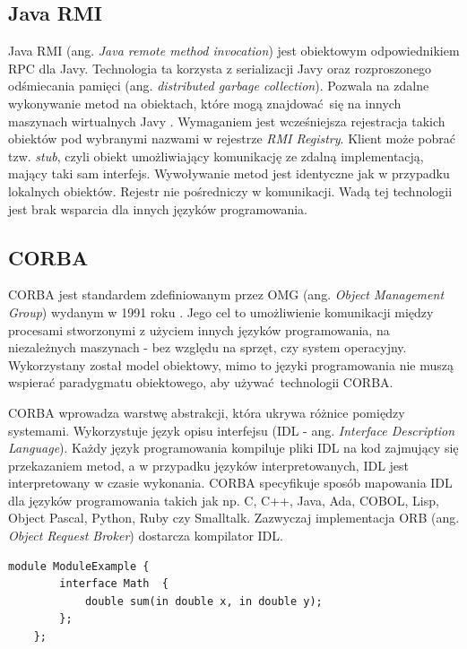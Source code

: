 \subsection{Java RMI}

Java RMI (ang. \textit{Java remote method invocation}) jest obiektowym odpowiednikiem RPC dla Javy. Technologia ta korzysta z serializacji Javy oraz rozproszonego odśmiecania pamięci (ang. \textit{distributed garbage collection}). Pozwala na zdalne wykonywanie metod na obiektach, które mogą znajdować się na innych maszynach wirtualnych Javy \cite{JAVA_RMI}. Wymaganiem jest wcześniejsza rejestracja takich obiektów pod wybranymi nazwami w rejestrze \textit{RMI Registry}. Klient może pobrać tzw. \textit{stub}, czyli obiekt umożliwiający komunikację ze zdalną implementacją, mający taki sam interfejs. Wywoływanie metod jest identyczne jak w przypadku lokalnych obiektów. Rejestr nie pośredniczy w komunikacji. Wadą tej technologii jest brak wsparcia dla innych języków programowania.


\subsection{CORBA}

CORBA jest standardem zdefiniowanym przez OMG (ang. \textit{Object Management Group}) wydanym w 1991 roku \cite{CORBA}. Jego cel to umożliwienie komunikacji między procesami stworzonymi z użyciem innych języków programowania, na niezależnych maszynach - bez względu na sprzęt, czy system operacyjny. Wykorzystany został model obiektowy, mimo to języki programowania nie muszą wspierać paradygmatu obiektowego, aby używać technologii CORBA.

CORBA wprowadza warstwę abstrakcji, która ukrywa różnice pomiędzy systemami. Wykorzystuje język opisu interfejsu (IDL - ang. \textit{Interface Description Language}). Każdy język programowania kompiluje pliki IDL na kod zajmujący się przekazaniem metod, a w przypadku języków interpretowanych, IDL jest interpretowany w czasie wykonania. CORBA specyfikuje sposób mapowania IDL dla języków programowania takich jak np. C, C++, Java, Ada, COBOL, Lisp, Object Pascal, Python, Ruby czy Smalltalk. Zazwyczaj implementacja ORB (ang. \textit{Object Request Broker}) dostarcza kompilator IDL.


\begin{lstlisting}[caption={Przykład użycia IDL},captionpos=b]
    module ModuleExample {
        interface Math  {
            double sum(in double x, in double y);
        };
    };
\end{lstlisting}


